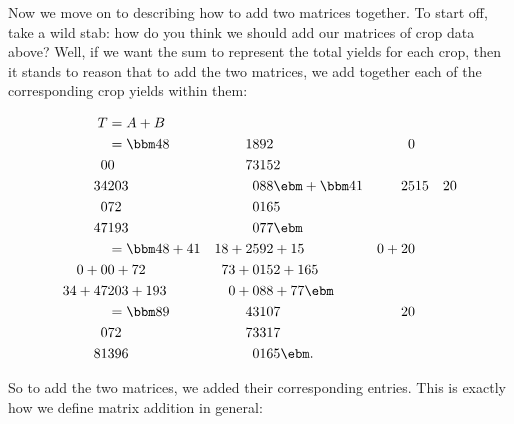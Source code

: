Now we move on to describing how to add two matrices together. To start off, take a wild stab: how do you think we should add our matrices of crop data above? Well, if we want the sum to represent the total yields for each crop, then it stands to reason that to add the two matrices, we add together each of the corresponding crop yields within them:

\begin{align*}
T & = A+B\\
  & = \bbm 48 & 18 & 92 & 0\\ 0 & 0 & 73 & 152\\ 34 & 203 & 0 & 88 \ebm + \bbm 41 & 25 & 15 & 20\\ 0 & 72 & 0 & 165\\ 47 & 193 & 0 & 77\ebm\\
  & = \bbm 48+41 & 18+25 & 92+15 & 0+20\\ 0 + 0 & 0 + 72 & 73 + 0 & 152 +165\\ 34+47 & 203 + 193 & 0 + 0 & 88+77\ebm\\
  & = \bbm 89 & 43 & 107 & 20\\0& 72 & 73 & 317\\81 & 396 & 0 & 165\ebm.
\end{align*}

So to add the two matrices, we added their corresponding entries. This is exactly how we define matrix addition in general:

\smallskip


\smallskip

